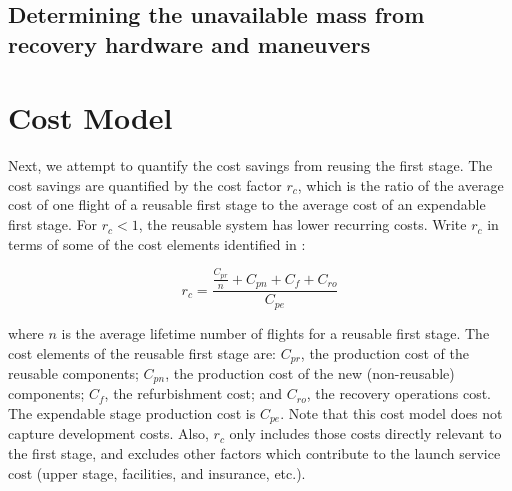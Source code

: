 \documentclass[conf]{new-aiaa}
\begin{document}
\subsection{Determining the unavailable mass from recovery hardware and maneuvers}





\section{Cost Model}
Next, we attempt to quantify the cost savings from reusing the first stage. The cost savings are quantified by the cost factor $r_c$, which is the ratio of the average cost of one flight of a reusable first stage to the average cost of an expendable first stage. For $r_c < 1$, the reusable system has lower recurring costs. Write $r_c$ in terms of some of the cost elements identified in \cite{Sforza2015}:

\begin{equation}
\label{eq:cost_elements}
r_c = \frac{\frac{C_{pr}}{n} + C_{pn} + C_f + C_{ro}}{C_{pe}}
\end{equation}

where $n$ is the average lifetime number of flights for a reusable first stage. The cost elements of the reusable first stage are: $C_{pr}$, the production cost of the reusable components; $C_{pn}$, the production cost of the new (non-reusable) components; $C_f$, the refurbishment cost; and $C_{ro}$, the recovery operations cost. The expendable stage production cost is $C_{pe}$. Note that this cost model does not capture development costs. Also, $r_c$ only includes those costs directly relevant to the first stage, and excludes other factors which contribute to the launch service cost (upper stage, facilities, and insurance, etc.).
\end{document}
